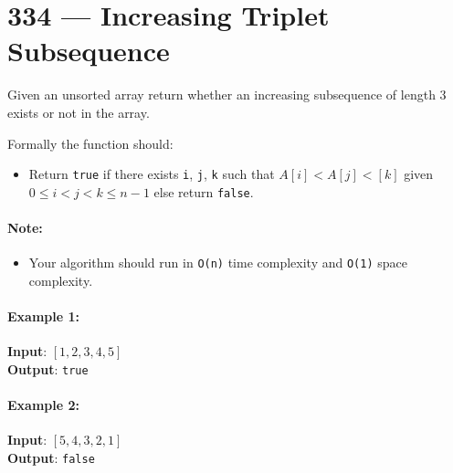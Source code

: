 \section{334 --- Increasing Triplet Subsequence}
Given an unsorted array return whether an increasing subsequence of length 3 exists or not in the array.
\par
Formally the function should:
\begin{itemize}
\item Return \texttt{true} if there exists \texttt{i}, \texttt{j}, \texttt{k} such that $A[i] < A[j] < [k]$ given $0 \leq i < j < k \leq n-1$ else return \texttt{false}.

\end{itemize}

\paragraph{Note:} 
\begin{itemize}
\item Your algorithm should run in \texttt{O(n)} time complexity and \texttt{O(1)} space complexity.
\end{itemize}

\paragraph{Example 1:}

\begin{flushleft}
\textbf{Input}: $[1,2,3,4,5]$
\\
\textbf{Output}: \texttt{true}
\end{flushleft}

\paragraph{Example 2:}

\begin{flushleft}
\textbf{Input}: $[5,4,3,2,1]$
\\
\textbf{Output}: \texttt{false}
\end{flushleft}




